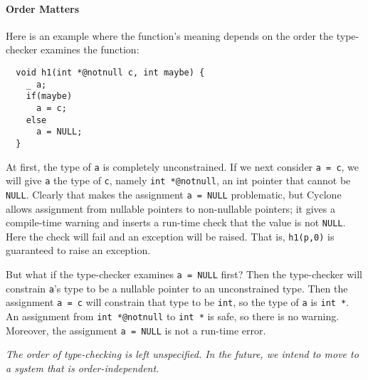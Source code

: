 \paragraph{Order Matters}
Here is an example where the function's meaning depends on the order
the type-checker examines the function:
\begin{verbatim}
  void h1(int *@notnull c, int maybe) {
    _ a;
    if(maybe)
      a = c;
    else
      a = NULL;
  }
\end{verbatim}
At first, the type of \texttt{a} is completely unconstrained.  If we
next consider \texttt{a = c}, we will give \texttt{a} the type of
\texttt{c}, namely \texttt{int *@notnull}, an int pointer that cannot be
\texttt{NULL}.  Clearly that makes the assignment \texttt{a = NULL}
problematic, but Cyclone allows assignment from nullable pointers to
non-nullable pointers; it gives a compile-time warning and inserts a
run-time check that the value is not \texttt{NULL}.  Here the check will
fail and an exception will be raised.  That is, \texttt{h1(p,0)} is
guaranteed to raise an exception.

But what if the type-checker examines \texttt{a = NULL} first?  Then the
type-checker will constrain \texttt{a}'s type to be a nullable pointer
to an unconstrained type.  Then the assignment \texttt{a = c} will
constrain that type to be \texttt{int}, so the type of \texttt{a} is
\texttt{int *}.  An assignment from \texttt{int *@notnull} to \texttt{int *} is
safe, so there is no warning.  Moreover, the assignment \texttt{a = NULL} is
not a run-time error.

\emph{The order of type-checking is left unspecified.  In the future,
  we intend to move to a system that is order-independent.}

